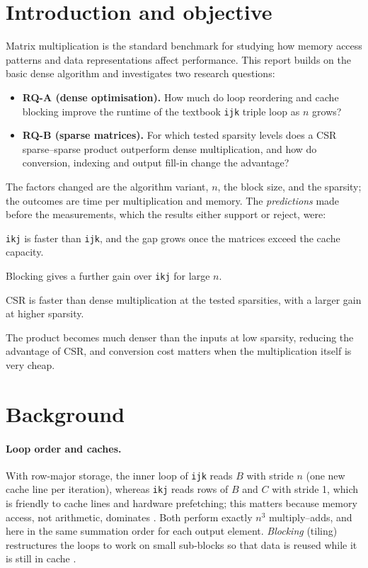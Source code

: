 \documentclass[11pt,a4paper]{article}
\begin{document}
\section{Introduction and objective}
Matrix multiplication is the standard benchmark for studying how memory access patterns and data representations affect performance. This report builds on the basic dense algorithm and investigates two research questions:
\begin{itemize}
\item \textbf{RQ-A (dense optimisation).} How much do loop reordering and cache blocking improve the runtime of the textbook \texttt{ijk} triple loop as $n$ grows?
\item \textbf{RQ-B (sparse matrices).} For which tested sparsity levels does a CSR sparse--sparse product outperform dense multiplication, and how do conversion, indexing and output fill-in change the advantage?
\end{itemize}
The factors changed are the algorithm variant, $n$, the block size, and the sparsity; the outcomes are time per multiplication and memory. The \emph{predictions} made before the measurements, which the results either support or reject, were:
\begin{description}[leftmargin=1.6em,labelwidth=1.6em,labelsep=0.4em]
\item[H1] \texttt{ikj} is faster than \texttt{ijk}, and the gap grows once the matrices exceed the cache capacity.
\item[H2] Blocking gives a further gain over \texttt{ikj} for large $n$.
\item[H3] CSR is faster than dense multiplication at the tested sparsities, with a larger gain at higher sparsity.
\item[H4] The product becomes much denser than the inputs at low sparsity, reducing the advantage of CSR, and conversion cost matters when the multiplication itself is very cheap.
\end{description}

\section{Background}
\paragraph{Loop order and caches.} With row-major storage, the inner loop of \texttt{ijk} reads $B$ with stride $n$ (one new cache line per iteration), whereas \texttt{ikj} reads rows of $B$ and $C$ with stride 1, which is friendly to cache lines and hardware prefetching; this matters because memory access, not arithmetic, dominates \cite{drepper2007}. Both perform exactly $n^3$ multiply--adds, and here in the same summation order for each output element. \emph{Blocking} (tiling) restructures the loops to work on small sub-blocks so that data is reused while it is still in cache \cite{lam1991,goto2008}.
\end{document}
